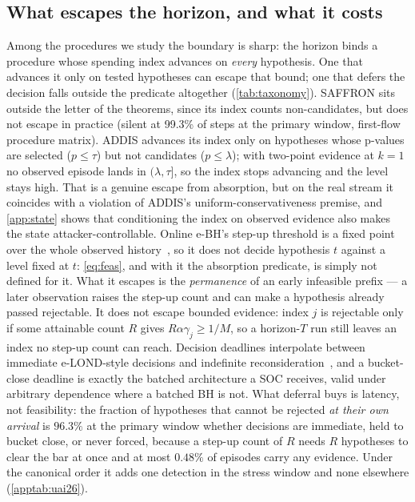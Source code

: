 \documentclass[conference]{IEEEtran}
\newcommand{\ceil}{M}
\begin{document}


\subsection{What escapes the horizon, and what it costs}\label{app:taxonomy}

Among the procedures we study the boundary is sharp: the horizon binds a procedure whose spending index
advances on \emph{every} hypothesis. One that advances it only on tested hypotheses can escape that
bound; one that defers the decision falls outside the predicate altogether (\cref{tab:taxonomy}).
SAFFRON sits outside the letter of the theorems, since its index counts non-candidates, but does not
escape in practice (silent at 99.3\% of steps at the primary window, first-flow procedure matrix).
ADDIS advances its index only on hypotheses whose p-values are selected ($p\le\tau$) but not candidates
($p\le\lambda$); with two-point evidence at $k=1$ no observed episode lands in $(\lambda,\tau]$, so the
index stops advancing and the level stays high. That is a genuine escape from absorption, but on the
real stream it coincides with a violation of ADDIS's uniform-conservativeness premise, and
\cref{app:state} shows that conditioning the index on observed evidence also makes the state
attacker-controllable. Online e-BH's step-up threshold is a fixed point over the whole observed
history~\cite{xu2024elond,wang2022evaluebh,fischer2025onlineebh}, so it does not decide hypothesis $t$
against a level fixed at $t$: \eqref{eq:feas}, and with it the absorption predicate, is simply not
defined for it. What it escapes is the \emph{permanence} of an early infeasible prefix --- a later
observation raises the step-up count and can make a hypothesis already passed rejectable. It does not
escape bounded evidence: index $j$ is rejectable only if some attainable count $R$ gives
$R\alpha\gamma_j\ge1/\ceil$, so a horizon-$T$ run still leaves an index no step-up count can reach.
Decision deadlines interpolate between immediate e-LOND-style decisions and indefinite
reconsideration~\cite{fisher2022deadlines,xu2026eclosure}, and a bucket-close deadline is exactly the
batched architecture a SOC receives, valid under arbitrary dependence where a batched BH is not. What
deferral buys is latency, not feasibility: the fraction of hypotheses that cannot be rejected \emph{at
their own arrival} is $96.3\%$ at the primary window whether decisions are immediate, held to bucket
close, or never forced, because a step-up count of $R$ needs $R$ hypotheses to clear the bar at once and
at most $0.48\%$ of episodes carry any evidence. Under the canonical order it adds one detection in the
stress window and none elsewhere (\cref{apptab:uai26}).
\end{document}
